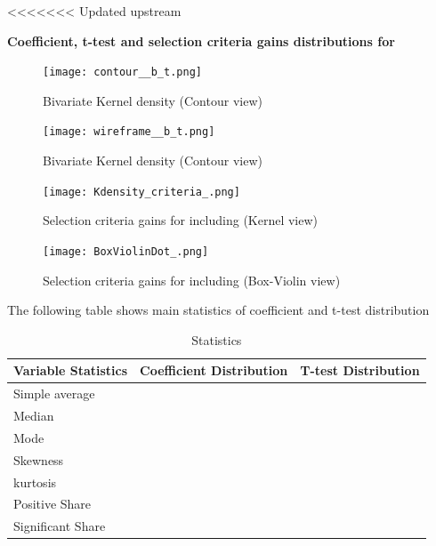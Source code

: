 \documentclass{article}
\begin{document}
\clearpage
<<<<<<< Updated upstream
\begin{center}
    \large{\textbf{Coefficient, t-test and selection criteria gains distributions for  }}
\end{center}

\vspace{-5mm}

\begin{figure}[!ht]
  \centering
  \begin{minipage}[b]{0.46\textwidth}
    \centering
    \texttt{[image: contour\_\_b\_t.png]}
    \caption{Bivariate Kernel density (Contour view)}
  \end{minipage}
  \hfill
  \begin{minipage}[b]{0.53\textwidth}
    \centering
    \texttt{[image: wireframe\_\_b\_t.png]}
    \caption{Bivariate Kernel density (Contour view)}
  \end{minipage}

  \begin{minipage}[b]{0.48\textwidth}
    \centering
    \texttt{[image: Kdensity\_criteria\_.png]}
    \caption{Selection criteria gains for including  (Kernel view)}
  \end{minipage}
  \hfill
  \begin{minipage}[b]{0.48\textwidth}
    \centering    
    \texttt{[image: BoxViolinDot\_.png]}
    \caption{Selection criteria gains for including  (Box-Violin view)}    
  \end{minipage}
\end{figure}

\vspace{1cm}

The following table shows main statistics of coefficient and t-test distribution 

\begin{table}[!h]
    \centering
    \caption{Statistics}
    \begin{tabular}{|l|c|c|}
    \hline
    Variable  Statistics &  Coefficient Distribution &  T-test Distribution  \\
    \hline
    \hline
    Simple average    &       &  \\
    \hline
    Median            &    &  \\
    \hline
    Mode              &      &  \\
    \hline
    Skewness          &       &  \\
    \hline
    kurtosis          &      &  \\
    \hline
    Positive Share    &      &  \\
    \hline
    Significant Share &  &  \\
    \hline
    \end{tabular}
\end{table}
\end{document}

